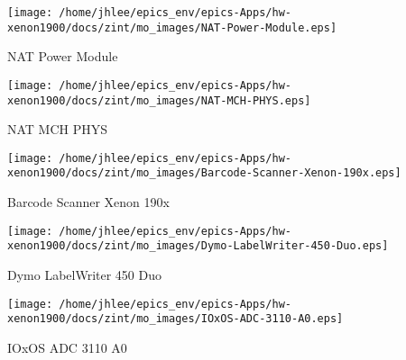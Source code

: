 \noindent
\vspace{1.4cm}
\begin{minipage}{.2\textwidth}
\begin{center}
\texttt{[image: /home/jhlee/epics\_env/epics-Apps/hw-xenon1900/docs/zint/mo\_images/NAT-Power-Module.eps]}
\end{center}
\end{minipage}
\begin{minipage}{.7\textwidth}
NAT Power Module
\end{minipage}


\noindent
\vspace{1.4cm}
\begin{minipage}{.2\textwidth}
\begin{center}
\texttt{[image: /home/jhlee/epics\_env/epics-Apps/hw-xenon1900/docs/zint/mo\_images/NAT-MCH-PHYS.eps]}
\end{center}
\end{minipage}
\begin{minipage}{.7\textwidth}
NAT MCH PHYS
\end{minipage}


\noindent
\vspace{1.4cm}
\begin{minipage}{.2\textwidth}
\begin{center}
\texttt{[image: /home/jhlee/epics\_env/epics-Apps/hw-xenon1900/docs/zint/mo\_images/Barcode-Scanner-Xenon-190x.eps]}
\end{center}
\end{minipage}
\begin{minipage}{.7\textwidth}
Barcode Scanner Xenon 190x
\end{minipage}


\noindent
\vspace{1.4cm}
\begin{minipage}{.2\textwidth}
\begin{center}
\texttt{[image: /home/jhlee/epics\_env/epics-Apps/hw-xenon1900/docs/zint/mo\_images/Dymo-LabelWriter-450-Duo.eps]}
\end{center}
\end{minipage}
\begin{minipage}{.7\textwidth}
Dymo LabelWriter 450 Duo
\end{minipage}


\noindent
\vspace{1.4cm}
\begin{minipage}{.2\textwidth}
\begin{center}
\texttt{[image: /home/jhlee/epics\_env/epics-Apps/hw-xenon1900/docs/zint/mo\_images/IOxOS-ADC-3110-A0.eps]}
\end{center}
\end{minipage}
\begin{minipage}{.7\textwidth}
IOxOS ADC 3110 A0
\end{minipage}


